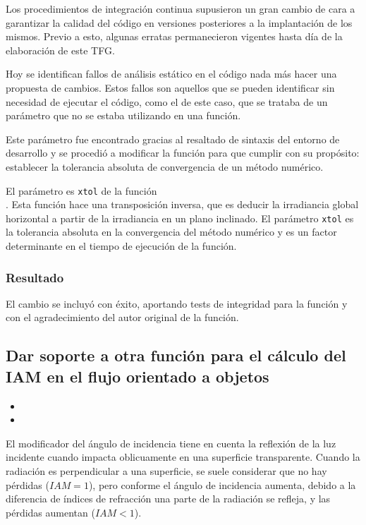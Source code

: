 Los procedimientos de integración continua supusieron un gran cambio de cara a garantizar la calidad del código en versiones posteriores a la implantación de los mismos. Previo a esto, algunas erratas permanecieron vigentes hasta día de la elaboración de este TFG.

Hoy se identifican fallos de análisis estático en el código nada más hacer una propuesta de cambios. Estos fallos son aquellos que se pueden identificar sin necesidad de ejecutar el código, como el de este caso, que se trataba de un \gls{parámetro} que no se estaba utilizando en una función.

Este parámetro fue encontrado gracias al resaltado de sintaxis del \gls{entorno de desarrollo} y se procedió a modificar la función para que cumplir con su propósito: establecer la tolerancia absoluta de convergencia de un método numérico.

El parámetro es \texttt{xtol} de la función\\ . Esta función hace una \gls{transposición inversa}, que es deducir la irradiancia global horizontal a partir de la irradiancia en un plano inclinado. El parámetro \texttt{xtol} es la tolerancia absoluta en la convergencia del método numérico y es un factor determinante en el tiempo de ejecución de la función.

\subsubsection{Resultado}

El cambio se incluyó con éxito, aportando tests de integridad para la función y con el agradecimiento del autor original de la función.

\subsection{Dar soporte a otra función para el cálculo del IAM en el flujo orientado a objetos}

\begin{itemize}
    \item {}
    \item {}
\end{itemize}

El modificador del ángulo de incidencia tiene en cuenta la reflexión de la luz incidente cuando impacta oblicuamente en una superficie transparente. Cuando la radiación es perpendicular a una superficie, se suele considerar que no hay pérdidas ($IAM = 1$), pero conforme el ángulo de incidencia aumenta, debido a la diferencia de índices de refracción una parte de la radiación se refleja, y las pérdidas aumentan ($IAM < 1$).

